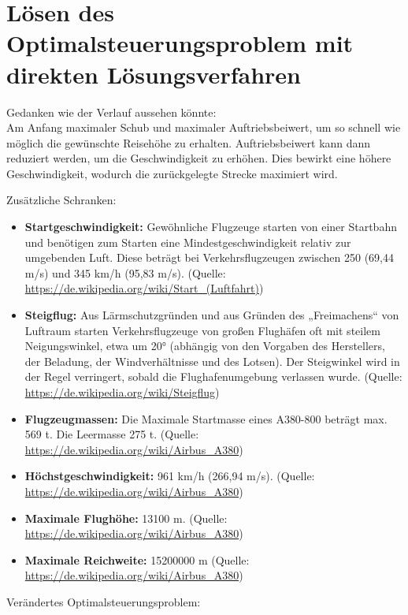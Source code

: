 \chapter{Lösen des Optimalsteuerungsproblem mit direkten Lösungsverfahren}
Gedanken wie der Verlauf aussehen könnte:\\
Am Anfang maximaler Schub und maximaler Auftriebsbeiwert, um so schnell wie möglich die gewünschte Reisehöhe zu erhalten. Auftriebsbeiwert kann dann reduziert werden, um die Geschwindigkeit zu erhöhen. Dies bewirkt eine höhere Geschwindigkeit, wodurch die zurückgelegte Strecke maximiert wird.


Zusätzliche Schranken:
\begin{itemize}
\item \textbf{Startgeschwindigkeit:} Gewöhnliche Flugzeuge starten von einer Startbahn und benötigen zum Starten eine Mindestgeschwindigkeit relativ zur umgebenden Luft. Diese beträgt bei Verkehrsflugzeugen zwischen 250 (69,44 m/s) und 345 km/h (95,83 m/s). (Quelle: \url{https://de.wikipedia.org/wiki/Start_(Luftfahrt)})
%
\item \textbf{Steigflug:} Aus Lärmschutzgründen und aus Gründen des „Freimachens“ von Luftraum starten Verkehrsflugzeuge von großen Flughäfen oft mit steilem Neigungswinkel, etwa um 20° (abhängig von den Vorgaben des Herstellers, der Beladung, der Windverhältnisse und des Lotsen). Der Steigwinkel wird in der Regel verringert, sobald die Flughafenumgebung verlassen wurde. (Quelle: \url{https://de.wikipedia.org/wiki/Steigflug})
%
\item \textbf{Flugzeugmassen:} Die Maximale Startmasse eines A380-800 beträgt max. 569 t. Die Leermasse 275 t. (Quelle: \url{https://de.wikipedia.org/wiki/Airbus_A380})
%
\item \textbf{Höchstgeschwindigkeit:} 961 km/h (266,94 m/s). (Quelle: \url{https://de.wikipedia.org/wiki/Airbus_A380})
%
\item \textbf{Maximale Flughöhe:} 13100 m. (Quelle: \url{https://de.wikipedia.org/wiki/Airbus_A380})
%
\item \textbf{Maximale Reichweite:} 15200000 m (Quelle: \url{https://de.wikipedia.org/wiki/Airbus_A380})
\end{itemize}
Verändertes Optimalsteuerungsproblem:
